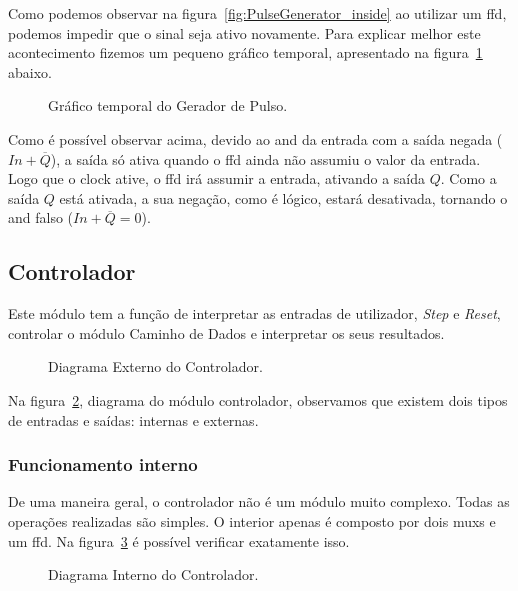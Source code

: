 Como podemos observar na figura~\ref{fig:PulseGenerator_inside} ao utilizar um \Gls{ffd}, podemos impedir que o sinal seja ativo novamente. Para explicar melhor este acontecimento fizemos um pequeno gráfico temporal, apresentado na figura~\ref{graph:PulseGenerator} abaixo.

\begin{figure}[H]
    \centering
    
    \caption{Gráfico temporal do Gerador de Pulso.}\label{graph:PulseGenerator}
\end{figure}

Como é possível observar acima, devido ao and da entrada com a saída negada ($In + \overline{Q}$), a saída só ativa quando o \Gls{ffd} ainda não assumiu o valor da entrada. Logo que o \gls{clock} ative, o \Gls{ffd} irá assumir a entrada, ativando a saída $Q$. Como a saída $Q$ está ativada, a sua negação, como é lógico, estará desativada, tornando o and falso ($In + \overline{Q} = 0$).

\subsection{Controlador}

Este módulo tem a função de interpretar as entradas de utilizador, \textit{Step} e \textit{Reset}, controlar o módulo Caminho de Dados e interpretar os seus resultados.

\begin{figure}[H]
    \centering
    
    \caption{Diagrama Externo do Controlador.}\label{fig:Controlador}
\end{figure}

Na figura~\ref{fig:Controlador}, diagrama do módulo controlador, observamos que existem dois tipos de entradas e saídas: internas e externas.



\subsubsection{Funcionamento interno}

De uma maneira geral, o controlador não é um módulo muito complexo. Todas as operações realizadas são simples. O interior apenas é composto por dois \glspl{mux} e um \gls{ffd}. Na figura~\ref{fig:Controlador_inside} é possível verificar exatamente isso.

\begin{figure}[H]
    \centering
    
    \caption{Diagrama Interno do Controlador.}\label{fig:Controlador_inside}
\end{figure}

